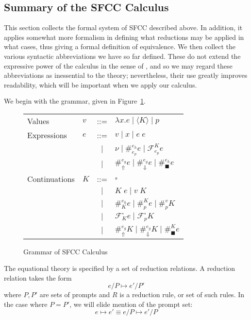 \documentclass[11pt]{article}
\newcommand{\maybePage}{\newpage}
\newcommand\F{\mathcal{F}}
\newcommand{\angles}[1]{\langle#1\rangle}
\begin{document}
\maybePage
\subsection{Summary of the SFCC Calculus}
\label{subsec:summarySFCCcalculus}

This section collects the formal system of SFCC described above.
In addition, it applies somewhat more formalism in defining what reductions may be applied in what cases, thus giving a formal definition of equivalence.
We then collect the various syntactic abbreviations we have so far defined.
These do not extend the expressive power of the calculus in the sense of \cite{Felleisen90expressive}, and so we may regard these abbreviations as inessential to the theory;
nevertheless, their use greatly improves readability, which will be important when we apply our calculus.

We begin with the grammar, given in Figure~\ref{fig:SFCCgrammar}.

\begin{figure}[H]
\caption{Grammar of SFCC Calculus}
\label{fig:SFCCgrammar}

\begin{tabular}{llcl}
Values & $v$ & ::= & $\lambda x.e \mid \angles{K} \mid p$ \\
Expressions & $e$ & ::= &
          $v \mid
           x \mid
           e\;e$ \\
& & $|$ & $\nu \mid
           \#_{e_p}^{e_h}e \mid
           \F_{e_p}^Ke$ \\
& & $|$ & $\#_\Uparrow^{e_g}e \mid
           \#_\Downarrow^{e_g}e \mid
           \#_\blacksquare^{e_h}e$ \\
Continuations & $K$ & ::= &
          $\square$ \\
& & $|$ & $K\;e \mid v\;K$ \\
& & $|$ & $\#_{K}^{e_h}e \mid
           \#_{p}^{K}e \mid
           \#_{p}^{v}K$ \\
& & $|$ & $\F_{K}^{\square}e \mid
           \F_{p}^{\square}K$ \\
& & $|$ & $\#_{\Uparrow}^{e_g}K \mid
           \#_{\Downarrow}^{e_g}K \mid
           \#_{\blacksquare}^{K}e$ \\
\end{tabular}
\end{figure}


The equational theory is specified by a set of reduction relations.
A reduction relation takes the form
$$e/P \mapsto e'/P'$$
where $P, P'$ are sets of prompts and $R$ is a reduction rule, or set of such rules.
In the case where $P = P'$, we will elide mention of the prompt set:
$$e \mapsto e' \equiv e/P \mapsto e'/P$$
\end{document}
